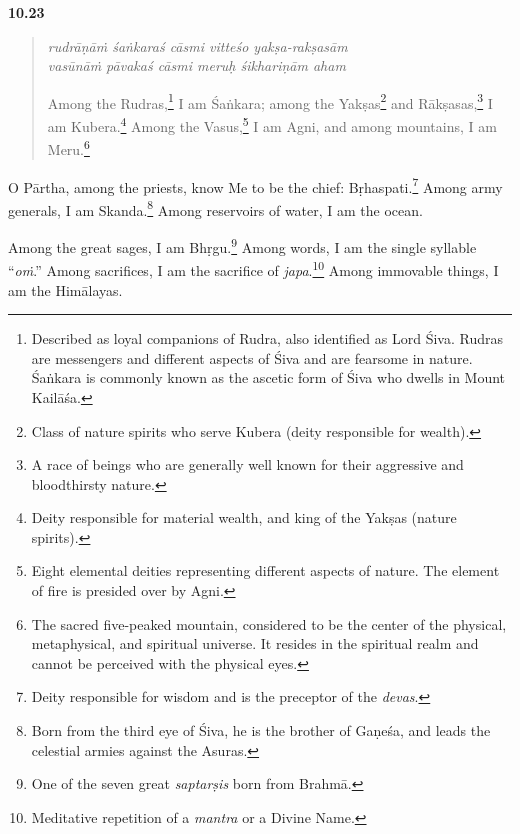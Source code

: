 \par\noindent\textbf{10.23}\par
\begin{verse}
\textit{rudrāṇāṁ śaṅkaraś cāsmi vitteśo yakṣa-rakṣasām} \\
\textit{vasūnāṁ pāvakaś cāsmi meruḥ śikhariṇām aham}

\noindent Among the Rudras,\footnote{Described as loyal companions of Rudra, also identified as Lord Śiva. Rudras are messengers and different aspects of Śiva and are fearsome in nature. Śaṅkara is commonly known as the ascetic form of Śiva who dwells in Mount Kailāśa.} I am Śaṅkara; among the Yakṣas\footnote{Class of nature spirits who serve Kubera (deity responsible for wealth).} and Rākṣasas,\footnote{A race of beings who are generally well known for their aggressive and bloodthirsty nature.} I am Kubera.\footnote{Deity responsible for material wealth, and king of the Yakṣas (nature spirits).} Among the Vasus,\footnote{Eight elemental deities representing different aspects of nature. The element of fire is presided over by Agni.} I am Agni, and among mountains, I am Meru.\footnote{The sacred five-peaked mountain, considered to be the center of the physical, metaphysical, and spiritual universe. It resides in the spiritual realm and cannot be perceived with the physical eyes.}
\end{verse}
\par


{O Pārtha, among the priests, know Me to be the chief: Bṛhaspati.\footnote{Deity responsible for wisdom and is the preceptor of the \textit{devas}.} Among army generals, I am Skanda.\footnote{Born from the third eye of Śiva, he is the brother of Gaṇeśa, and leads the celestial armies against the Asuras.} Among reservoirs of water, I am the ocean.}

{Among the great sages, I am Bhṛgu.\footnote{One of the seven great \textit{saptarṣis} born from Brahmā.} Among words, I am the single syllable \enquote{\textit{oṁ}.} Among sacrifices, I am the sacrifice of \textit{japa}.\footnote{Meditative repetition of a \textit{mantra} or a Divine Name.} Among immovable things, I am the Himālayas.}

